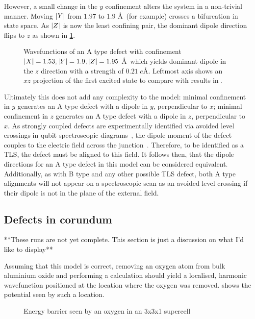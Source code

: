 However, a small change in the $y$ confinement alters the system in a non-trivial manner.
Moving $\lvert Y\rvert$ from $1.97$ to $1.9$ \AA\ (for example) crosses a bifurcation in state space.
As $\lvert Z\rvert$ is now the least confining pair, the dominant dipole direction flips to $z$ as shown in \cref{fig:atypez}.

\begin{figure}[htb]
  \resizebox{\textwidth}{!}{}
  \caption[wfns5]{\label{fig:atypez}Wavefunctions of an A type defect with confinement $\lvert X\rvert = 1.53, \lvert Y\rvert = 1.9, \lvert Z\rvert = 1.95$ \AA\ which yields dominant dipole in the $z$ direction with a strength of $0.21 \; e$\AA. Leftmost axis shows an $xz$ projection of the first excited state to compare with  results in .}
\end{figure}

Ultimately this does not add any complexity to the model: minimal confinement in $y$ generates an A type defect with a dipole in $y$, perpendicular to $x$; minimal confinement in $z$ generates an A type defect with a dipole in $z$, perpendicular to $x$.
As strongly coupled defects are experimentally identified via avoided level crossings in qubit spectroscopic diagrams~\cite{Lisenfeld2010}, the dipole moment of the defect couples to the electric field across the junction~\cite{Martinis2005}.
Therefore, to be identified as a TLS, the defect must be aligned to this field.
It follows then, that the dipole directions for an A type defect in this model can be considered equivalent.
Additionally, as with B type and any other possible TLS defect, both A type alignments will not appear on a spectroscopic scan as an avoided level crossing if their dipole is not in the plane of the external field.

\subsection{Defects in corundum}\label{sec:corundum}
**These runs are not yet complete. This section is just a discussion on what I'd like to display**

Assuming that this model is correct, removing an oxygen atom from bulk aluminium oxide and performing a calculation should yield a localised, harmonic wavefunction positioned at the location where the oxygen was removed.  shows the potential seen by such a location.

\begin{figure}[htb]
\caption{\label{fig:clustpot}Energy barrier seen by an oxygen in an  3x3x1 supercell}
\end{figure}

